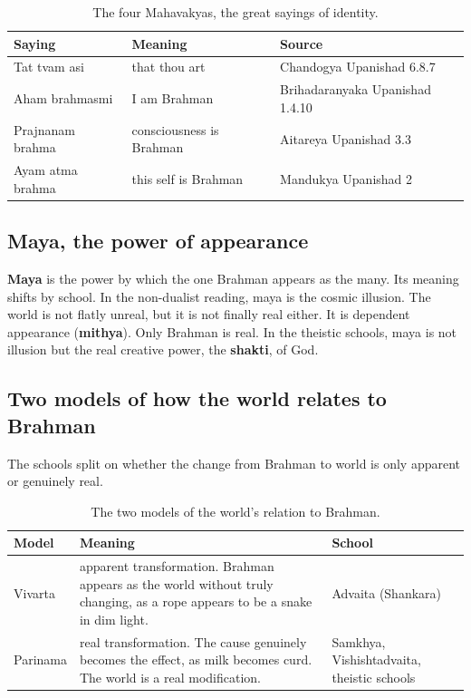 \begin{longtable}{@{} L{0.30\textwidth}L{0.30\textwidth}L{0.30\textwidth}@{}}
\caption{The four Mahavakyas, the great sayings of identity.}\\
\toprule
\textbf{Saying} & \textbf{Meaning} & \textbf{Source} \\
\midrule
Tat tvam asi & that thou art & Chandogya Upanishad 6.8.7 \\
Aham brahmasmi & I am Brahman & Brihadaranyaka Upanishad 1.4.10 \\
Prajnanam brahma & consciousness is Brahman & Aitareya Upanishad 3.3 \\
Ayam atma brahma & this self is Brahman & Mandukya Upanishad 2 \\
\bottomrule
\end{longtable}

\subsection{Maya, the power of appearance}

\textbf{Maya} is the power by which the one Brahman appears as the many. Its meaning shifts by school. In the non-dualist reading, maya is the cosmic illusion. The world is not flatly unreal, but it is not finally real either. It is dependent appearance (\textbf{mithya}). Only Brahman is real. In the theistic schools, maya is not illusion but the real creative power, the \textbf{shakti}, of God.

\subsection{Two models of how the world relates to Brahman}

The schools split on whether the change from Brahman to world is only apparent or genuinely real.

\begin{longtable}{@{} L{0.18\textwidth}L{0.52\textwidth}L{0.22\textwidth}@{}}
\caption{The two models of the world's relation to Brahman.}\\
\toprule
\textbf{Model} & \textbf{Meaning} & \textbf{School} \\
\midrule
Vivarta & apparent transformation. Brahman appears as the world without truly changing, as a rope appears to be a snake in dim light. & Advaita (Shankara) \\
Parinama & real transformation. The cause genuinely becomes the effect, as milk becomes curd. The world is a real modification. & Samkhya, Vishishtadvaita, theistic schools \\
\bottomrule
\end{longtable}

